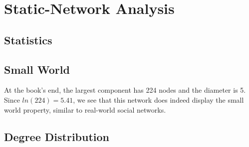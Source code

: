 \section{Static-Network Analysis}

\subsection{Statistics}

\subsection{Small World}
At the book's end, the largest component has 224 nodes and the diameter is 5.
Since $ln(224) = 5.41$, we see that this network does indeed display the small world property, similar to real-world social networks.

\subsection{Degree Distribution}

